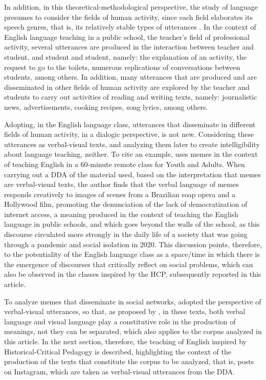\documentclass[english]{textolivre}
\begin{document}
In addition, in this theoretical-methodological perspective, the study of language presumes to consider the fields of human activity, since each field elaborates its speech genres, that is, its relatively stable types of utterances \cite{bakhtin_os_2016}. In the context of English language teaching in a public school, the teacher’s field of professional activity, several utterances are produced in the interaction between teacher and student, and student and student, namely: the explanation of an activity, the request to go to the toilets, numerous replications of conversations between students, among others. In addition, many utterances that are produced and are disseminated in other fields of human activity are explored by the teacher and students to carry out activities of reading and writing texts, namely: journalistic news, advertisements, cooking recipes, song lyrics, among others.

Adopting, in the English language class, utterances that disseminate in different fields of human activity, in a dialogic perspective, is not new. Considering these utterances as verbal-visual texts, and analyzing them later to create intelligibility about language teaching, neither. To cite an example, \textcite{limade2022auto} uses memes in the context of teaching English in a 60-minute remote class for Youth and Adults. When carrying out a DDA of the material used, based on the interpretation that memes are verbal-visual texts, the author finds that the verbal language of memes responds creatively to images of scenes from a Brazilian soap opera and a Hollywood film, promoting the denunciation of the lack of democratization of internet access, a meaning produced in the context of teaching the English language in public schools, and which goes beyond the walls of the school, as this discourse circulated more strongly in the daily life of a society that was going through a pandemic and social isolation in 2020. This discussion points, therefore, to the potentiality of the English language class as a space/time in which there is the emergence of discourses that critically reflect on social problems, which can also be observed in the classes inspired by the HCP, subsequently reported in this article.

To analyze memes that disseminate in social networks, \textcite{limade2022auto} adopted the perspective of verbal-visual utterances, so that, as proposed by \textcite{brait_olhar_2013}, in these texts, both verbal language and visual language play a constitutive role in the production of meanings, not they can be separated, which also applies to the corpus analyzed in this article. In the next section, therefore, the teaching of English inspired by Historical-Critical Pedagogy is described, highlighting the context of the production of the texts that constitute the corpus to be analyzed, that is, posts on Instagram, which are taken as verbal-visual utterances from the DDA.
\end{document}
